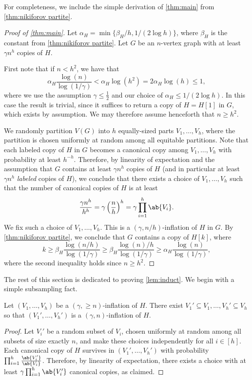For completeness, we include the simple derivation of \cref{thm:main} from \cref{thm:nikiforov partite}.
\begin{proof}[Proof of \cref{thm:main}]
    Let $\alpha_H = \min \{\beta_H/h, 1/(2\log h)\}$, where $\beta_H$ is the constant from \cref{thm:nikiforov partite}. Let $G$ be an $n$-vertex graph with at least $\gamma n^h$ copies of $H$.

    First note that if $n <h^2$, we have that
    \[
    \alpha_H \frac{\log(n)}{\log(1/\gamma)} < \alpha_H \log(h^2)= 2\alpha_H \log(h) \leq 1,
    \]
    where we use the assumption $\gamma \leq \frac 12$ and our choice of $\alpha_H \leq 1/(2\log h)$. In this case the result is trivial, since it suffices to return a copy of $H=H[1]$ in $G$, which exists by assumption. We may therefore assume henceforth that $n \geq h^2$.
    
    We randomly partition $V(G)$ into $h$ equally-sized parts $V_1,\dots,V_h$, where the partition is chosen uniformly at random among all equitable partitions. Note that each labeled copy of $H$ in $G$ becomes a canonical copy among $V_1,\dots,V_h$ with probability at least $h^{-h}$. Therefore, by linearity of expectation and the assumption that $G$ contains at least $\gamma n^h$ copies of $H$ (and in particular at least $\gamma n^h$ \emph{labeled} copies of $H$), we conclude that there exists a choice of $V_1,\dots,V_h$ such that the number of canonical copies of $H$ is at least
    \[
        \frac{\gamma n^h}{h^h} = \gamma \left( \frac nh \right)^h=\gamma \prod_{i=1}^h \ab{V_i}.
    \]
    We fix such a choice of $V_1,\dots,V_h$. This is a $(\gamma,n/h)$-inflation of $H$ in $G$. By \cref{thm:nikiforov partite}, we conclude that $G$ contains a copy of $H[k]$, where
    \[
    k \geq \beta_H \frac{\log(n/h)}{\log(1/\gamma)} \geq \beta_H \frac{\log(n)/h}{\log(1/\gamma)} \geq \alpha_H \frac{\log(n)}{\log(1/\gamma)},
    \]
    where the second inequality holds since $n \geq h^2$.
\end{proof}
The rest of this section is dedicated to proving \cref{lem:induct}. 
We begin with a simple subsampling fact.
\begin{lemma}\label{lem:subsample}
    Let $(V_1,\dots,V_h)$ be a $(\gamma, \geq n)$-inflation of $H$. There exist $V_1'\subseteq V_1,\dots,V_h'\subseteq V_h$ so that $(V_1',\dots,V_h')$ is a $(\gamma,n)$-inflation of $H$.
\end{lemma}
\begin{proof}
    Let $V_i'$ be a random subset of $V_i$, chosen uniformly at random among all subsets of size exactly $n$, and make these choices independently for all $i \in [h]$. Each canonical copy of $H$ survives in $(V_1',\dots,V_h')$ with probability $\prod_{i=1}^h \frac{\ab{V_i'}}{\ab{V_i}}$. Therefore, by linearity of expectation, there exists a choice with at least $\gamma \prod_{i=1}^h \ab{V_i'}$ canonical copies, as claimed.
\end{proof}

